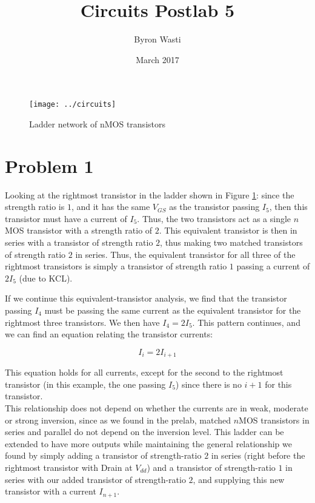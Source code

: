\documentclass{article}
\title{Circuits Postlab 5}
\author{Byron Wasti}
\date{March 2017}
\begin{document}
\maketitle

\begin{figure}[h]
    \centering
    \texttt{[image: ../circuits]}
    \caption{Ladder network of nMOS transistors}
    \label{fig:one}
\end{figure}

\section{Problem 1}

Looking at the rightmost transistor in the ladder shown in Figure \ref{fig:one}: since the strength ratio is $1$, and it has the same $V_{GS}$ as the transistor passing $I_5$, then this transistor must have a current of $I_5$. Thus, the two transistors act as a single $n$MOS transistor with a strength ratio of $2$. This equivalent transistor is then in series with a transistor of strength ratio $2$, thus making two matched transistors of strength ratio $2$ in series. Thus, the equivalent transistor for all three of the rightmost transistors is simply a transistor of strength ratio $1$ passing a current of $2I_5$ (due to KCL).

If we continue this equivalent-transistor analysis, we find that the transistor passing $I_4$ must be passing the same current as the equivalent transistor for the rightmost three transistors. We then have $I_4 = 2I_5$. This pattern continues, and we can find an equation relating the transistor currents:

\begin{equation}
    I_i = 2I_{i+1}
\end{equation}

This equation holds for all currents, except for the second to the rightmost transistor (in this example, the one passing $I_5$) since there is no $i+1$ for this transistor.\\

This relationship does not depend on whether the currents are in weak, moderate or strong inversion, since as we found in the prelab, matched $n$MOS transistors in series and parallel do not depend on the inversion level. This ladder can be extended to have more outputs while maintaining the general relationship we found by simply adding a transistor of strength-ratio $2$ in series (right before the rightmost transistor with Drain at $V_{dd}$) and a transistor of strength-ratio $1$ in series with our added transistor of strength-ratio $2$, and supplying this new transistor with a current $I_{n+1}$.
\end{document}
